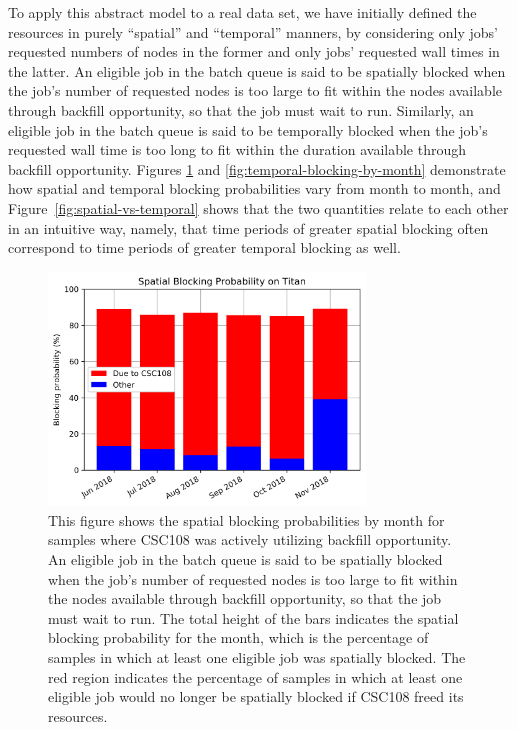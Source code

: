 To apply this abstract model to a real data set, we have initially defined the
resources in purely ``spatial'' and ``temporal'' manners, by considering only
jobs' requested numbers of nodes in the former and only jobs' requested wall
times in the latter. An eligible job in the batch queue is said to be spatially
blocked when the job’s number of requested nodes is too large to fit within the
nodes available through backfill opportunity, so that the job must wait to run.
Similarly, an eligible job in the batch queue is said to be temporally blocked
when the job’s requested wall time is too long to fit within the duration
available through backfill opportunity. Figures
\ref{fig:spatial-blocking-by-month} and \ref{fig:temporal-blocking-by-month}
demonstrate how spatial and temporal blocking probabilities vary from month to
month, and Figure~\ref{fig:spatial-vs-temporal} shows that the two quantities
relate to each other in an intuitive way, namely, that time periods of greater
spatial blocking often correspond to time periods of greater temporal blocking
as well.


\begin{figure}
  \includegraphics[width=0.75\textwidth]{images/barplot-spatial-blocking-by-month.png}
\caption{This figure shows the spatial blocking probabilities by month for
samples where CSC108 was actively utilizing backfill opportunity. An eligible
job in the batch queue is said to be spatially blocked when the job's number of
requested nodes is too large to fit within the nodes available through backfill
opportunity, so that the job must wait to run. The total height of the bars
indicates the spatial blocking probability for the month, which is the
percentage of samples in which at least one eligible job was spatially blocked.
The red region indicates the percentage of samples in which at least one
eligible job would no longer be spatially blocked if CSC108 freed its
resources.}
\label{fig:spatial-blocking-by-month}
\end{figure}

